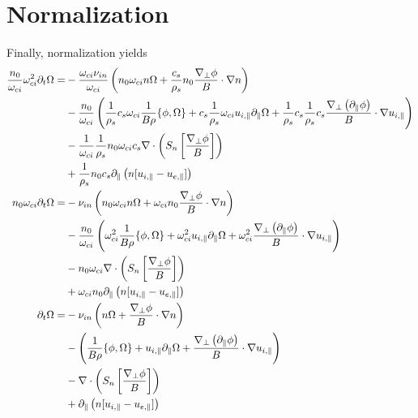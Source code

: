 \section{Normalization}
Finally, normalization yields
%
\begin{align*}
 \frac{n_0}{\omega_{ci}}\omega_{ci}^2\partial_t\Omega
 =&
 - \frac{\omega_{ci}\nu_{in}}{\omega_{ci}}
 \left(n_0\omega_{ci}n\Omega
 + \frac{c_s}{\rho_s}n_0\frac{\nabla_\perp \phi}{B} \cdot \nabla n\right)
  \\
 &- \frac{n_0}{\omega_{ci}}
 \left(\frac{1}{\rho_s} c_s \omega_{ci}\frac{1}{B\rho}\{\phi, \Omega\}
    + c_s \frac{1}{\rho_s}\omega_{ci}u_{i,\|}\partial_\|\Omega
    + \frac{1}{\rho_s}c_s\frac{1}{\rho_s}c_s
    \frac{\nabla_\perp\left( \partial_\|\phi\right)}{B}\cdot\nabla u_{i,\|}
 \right)
 \\
 &
 - \frac{1}{\omega_{ci}}\frac{1}{\rho_s}n_0\omega_{ci}c_s
    \nabla\cdot \left( S_n \left[ \frac{ \nabla_\perp \phi }{ B } \right] \right)
 \\
 &
 + \frac{1}{\rho_s}n_0c_s\partial_\| \left(n [u_{i,\|} - u_{e,\|}]\right)
 \\
 n_0\omega_{ci}\partial_t\Omega
 =&
 - \nu_{in}
 \left(n_0\omega_{ci}n\Omega
 + \omega_{ci}n_0\frac{\nabla_\perp \phi}{B} \cdot \nabla n\right)
  \\
 &- \frac{n_0}{\omega_{ci}}
 \left(\omega_{ci}^2\frac{1}{B\rho}\{\phi, \Omega\}
    + \omega_{ci}^2u_{i,\|}\partial_\|\Omega
    + \omega_{ci}^2
    \frac{\nabla_\perp\left( \partial_\|\phi\right)}{B}\cdot\nabla u_{i,\|}
 \right)
 \\
 &
 - n_0\omega_{ci}
    \nabla\cdot \left( S_n \left[ \frac{ \nabla_\perp \phi }{ B } \right] \right)
 \\
 &
 + \omega_{ci}n_0\partial_\| \left(n [u_{i,\|} - u_{e,\|}]\right)
 \\
 \partial_t\Omega
 =&
 - \nu_{in}
 \left(n\Omega
 + \frac{\nabla_\perp \phi}{B} \cdot \nabla n\right)
  \\
 &-
 \left(\frac{1}{B\rho}\{\phi, \Omega\}
    + u_{i,\|}\partial_\|\Omega
    +\frac{\nabla_\perp\left( \partial_\|\phi\right)}{B}\cdot\nabla u_{i,\|}
 \right)
 \\
 &
 - \nabla\cdot \left( S_n \left[ \frac{ \nabla_\perp \phi }{ B } \right] \right)
 \\
 &
 + \partial_\| \left(n [u_{i,\|} - u_{e,\|}]\right)
\end{align*}

